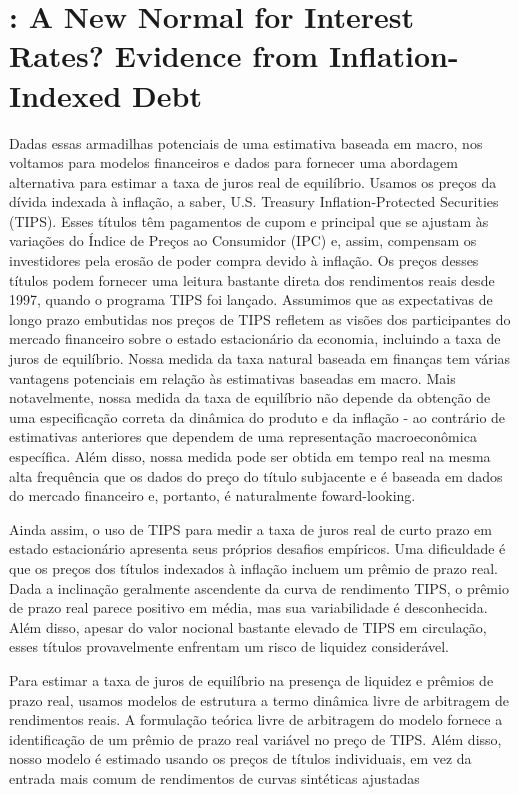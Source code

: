 \section{\citet{Rudebusch:2019}: A New Normal for Interest Rates? Evidence from Inflation-Indexed Debt}

Dadas essas armadilhas potenciais de uma estimativa baseada em macro, nos voltamos para modelos financeiros e dados para fornecer uma abordagem alternativa para estimar a taxa de juros real de equilíbrio. Usamos os preços da dívida indexada à inflação, a saber, U.S. Treasury Inflation-Protected Securities (TIPS). Esses títulos têm pagamentos de cupom e principal que se ajustam às variações do Índice de Preços ao Consumidor (IPC) e, assim, compensam os investidores pela erosão de poder compra devido à inflação. Os preços desses títulos podem fornecer uma leitura bastante direta dos rendimentos reais desde 1997, quando o programa TIPS foi lançado. Assumimos que as expectativas de longo prazo embutidas nos preços de TIPS refletem as visões dos participantes do mercado financeiro sobre o estado estacionário da economia, incluindo a taxa de juros de equilíbrio. Nossa medida da taxa natural baseada em finanças tem várias vantagens potenciais em relação às estimativas baseadas em macro. Mais notavelmente, nossa medida da taxa de equilíbrio não depende da obtenção de uma especificação correta da dinâmica do produto e da inflação - ao contrário de estimativas anteriores que dependem de uma representação macroeconômica específica. Além disso, nossa medida pode ser obtida em tempo real na mesma alta frequência que os dados do preço do título subjacente e é baseada em dados do mercado financeiro e, portanto, é naturalmente foward-looking.

Ainda assim, o uso de TIPS para medir a taxa de juros real de curto prazo em estado estacionário apresenta seus próprios desafios empíricos. Uma dificuldade é que os preços dos títulos indexados à inflação incluem um prêmio de prazo real. Dada a inclinação geralmente ascendente da curva de rendimento TIPS, o prêmio de prazo real parece positivo em média, mas sua variabilidade é desconhecida. Além disso, apesar do valor nocional bastante elevado de TIPS em circulação, esses títulos provavelmente enfrentam um risco de liquidez considerável.

Para estimar a taxa de juros de equilíbrio na presença de liquidez e prêmios de prazo real, usamos modelos de estrutura a termo dinâmica livre de arbitragem de rendimentos reais. A formulação teórica livre de arbitragem do modelo fornece a identificação de um prêmio de prazo real variável no preço de TIPS. Além disso, nosso modelo é estimado usando os preços de títulos individuais, em vez da entrada mais comum de rendimentos de curvas sintéticas ajustadas


